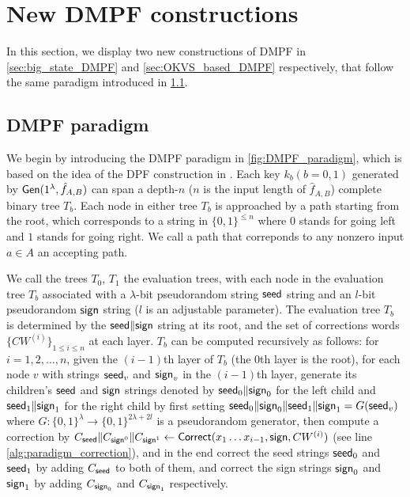 \section{New DMPF constructions}
In this section, we display two new constructions of DMPF in \cref{sec:big_state_DMPF} and \cref{sec:OKVS_based_DMPF} respectively,  that follow the same paradigm introduced in \cref{sec:DMPF_paradigm}. 

\subsection{DMPF paradigm}\label{sec:DMPF_paradigm}
We begin by introducing the DMPF paradigm in \cref{fig:DMPF_paradigm}, which is based on the idea of the DPF construction in \cite{CCS:BoyGilIsh16}. Each key $k_b(b=0,1)$ generated by ${\sf Gen}(1^\lambda,\hat{f}_{A,B})$ can span a depth-$n$ ($n$ is the input length of $\hat{f}_{A,B}$) complete binary tree $T_b$. Each node in either tree $T_b$ is approached by a path starting from the root, which corresponds to a string in $\{0,1\}^{\le n}$ where $0$ stands for going left and $1$ stands for going right. We call a path that correponds to any nonzero input $a\in A$ an accepting path. 



We call the trees $T_0$, $T_1$ the evaluation trees, with each node in the evaluation tree $T_b$ associated with a $\lambda$-bit pseudorandom string ${\sf seed}$ string and an $l$-bit pseudorandom ${\sf sign}$ string ($l$ is an adjustable parameter). 
The evaluation tree $T_b$ is determined by the ${\sf seed}\|{\sf sign}$ string at its root, and the set of corrections words $\{CW^{(i)}\}_{1\le i\le n}$ at each layer. $T_b$ can be computed recursively as follows: for $i = 1,2,\dots, n$, given the $(i-1)$th layer of $T_b$ (the 0th layer is the root), for each node $v$ with strings ${\sf seed}_v$ and ${\sf sign}_v$ in the $(i-1)$th layer, generate its children's ${\sf seed}$ and ${\sf sign}$ strings denoted by ${\sf seed}_0\|{\sf sign}_0$ for the left child and ${\sf seed}_1\|{\sf sign}_1$ for the right child by first setting ${\sf seed}_0\|{\sf sign}_0\|{\sf seed}_1\|{\sf sign}_1 = G({\sf seed}_v)$ where $G:\{0,1\}^\lambda\rightarrow \{0,1\}^{2\lambda+2l}$ is a pseudorandom generator, then compute a correction by $C_{\sf seed}\|C_{{\sf sign}^0}\|C_{{\sf sign}^1}\gets{\sf Correct}(x_1\dots x_{i-1}, {\sf sign}, CW^{(i)})$ (see line \ref{alg:paradigm_correction}), and in the end correct the seed strings ${\sf seed}_0$ and ${\sf seed}_1$ by adding $C_{\sf seed}$ to both of them, and correct the sign strings ${\sf sign}_0$ and ${\sf sign}_1$ by adding $C_{{\sf sign}_0}$ and $C_{{\sf sign}_1}$ respectively. 

